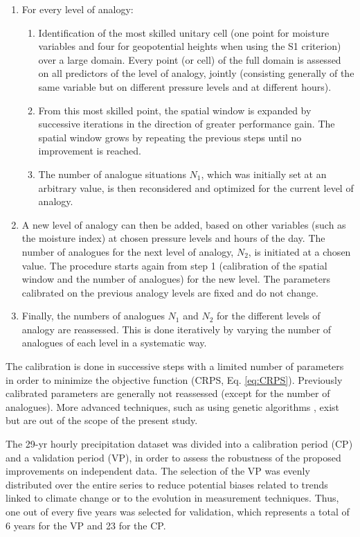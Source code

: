 \documentclass[hess, manuscript]{copernicus}
\begin{document}
	\begin{enumerate}
		\item For every level of analogy:
		\begin{enumerate}
			\item Identification of the most skilled unitary cell (one point for moisture variables and four for geopotential heights when using the S1 criterion) over a large domain. Every point (or cell) of the full domain is assessed on all predictors of the level of analogy, jointly (consisting generally of the same variable but on different pressure levels and at different hours).
			\item From this most skilled point, the spatial window is expanded by successive iterations in the direction of greater performance gain. The spatial window grows by repeating the previous steps until no improvement is reached.
			\item The number of analogue situations $N_{1}$, which was initially set at an arbitrary value, is then reconsidered and optimized for the current level of analogy.
		\end{enumerate}
		\item A new level of analogy can then be added, based on other variables (such as the moisture index) at chosen pressure levels and hours of the day. The number of analogues for the next level of analogy, $N_{2}$, is initiated at a chosen value. The procedure starts again from step 1 (calibration of the spatial window and the number of analogues) for the new level. The parameters calibrated on the previous analogy levels are fixed and do not change. 
		\item Finally, the numbers of analogues $N_{1}$ and $N_{2}$ for the different levels of analogy are reassessed. This is done iteratively by varying the number of analogues of each level in a systematic way.
	\end{enumerate}
	
	The calibration is done in successive steps with a limited number of parameters in order to minimize the objective function (CRPS, Eq. \ref{eq:CRPS}). Previously calibrated parameters are generally not reassessed (except for the number of analogues). More advanced techniques, such as using genetic algorithms \citep{Horton2017}, exist but are out of the scope of the present study.
	
	The 29-yr hourly precipitation dataset was divided into a calibration period (CP) and a validation period (VP), in order to assess the robustness of the proposed improvements on independent data. The selection of the VP was evenly distributed over the entire series \citep{BenDaoud2010} to reduce potential biases related to trends linked to climate change or to the evolution in measurement techniques. Thus, one out of every five years was selected for validation, which represents a total of 6 years for the VP and 23 for the CP.
	
\end{document}

